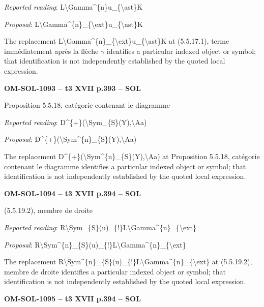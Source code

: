 \emph{Reported reading}: L\textbackslash{}Gamma\textasciicircum{}\{n\}u\_\{\textbackslash{}ast\}K\par
\emph{Proposal}: L\textbackslash{}Gamma\textasciicircum{}\{n\}\_\{\textbackslash{}ext\}u\_\{\textbackslash{}ast\}K\par
The replacement L\textbackslash{}Gamma\textasciicircum{}\{n\}\_\{\textbackslash{}ext\}u\_\{\textbackslash{}ast\}K at (5.5.17.1), terme immédiatement après la flèche \ensuremath{\gamma} identifies a particular indexed object or symbol; that identification is not independently established by the quoted local expression.\par
\par\noindent\textbf{OM-SOL-1093 -- t3 XVII p.393 -- SOL}\par
Proposition 5.5.18, catégorie contenant le diagramme\par
\emph{Reported reading}: D\textasciicircum{}\{+\}(\textbackslash{}Sym\_\{S\}(Y),\textbackslash{}Aa)\par
\emph{Proposal}: D\textasciicircum{}\{+\}(\textbackslash{}Sym\textasciicircum{}\{n\}\_\{S\}(Y),\textbackslash{}Aa)\par
The replacement D\textasciicircum{}\{+\}(\textbackslash{}Sym\textasciicircum{}\{n\}\_\{S\}(Y),\textbackslash{}Aa) at Proposition 5.5.18, catégorie contenant le diagramme identifies a particular indexed object or symbol; that identification is not independently established by the quoted local expression.\par
\par\noindent\textbf{OM-SOL-1094 -- t3 XVII p.394 -- SOL}\par
(5.5.19.2), membre de droite\par
\emph{Reported reading}: R\textbackslash{}Sym\_\{S\}(u)\_\{!\}L\textbackslash{}Gamma\textasciicircum{}\{n\}\_\{\textbackslash{}ext\}\par
\emph{Proposal}: R\textbackslash{}Sym\textasciicircum{}\{n\}\_\{S\}(u)\_\{!\}L\textbackslash{}Gamma\textasciicircum{}\{n\}\_\{\textbackslash{}ext\}\par
The replacement R\textbackslash{}Sym\textasciicircum{}\{n\}\_\{S\}(u)\_\{!\}L\textbackslash{}Gamma\textasciicircum{}\{n\}\_\{\textbackslash{}ext\} at (5.5.19.2), membre de droite identifies a particular indexed object or symbol; that identification is not independently established by the quoted local expression.\par
\par\noindent\textbf{OM-SOL-1095 -- t3 XVII p.394 -- SOL}\par
